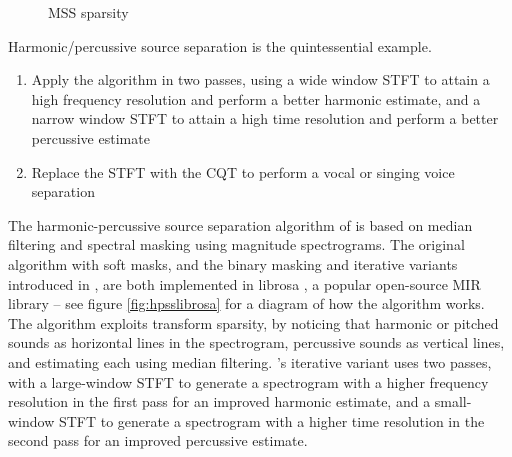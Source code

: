 \documentclass[report.tex]{subfiles}
\begin{document}
\begin{figure}[ht]
	\centering
	\caption{MSS sparsity}
	\label{fig:sepgood}
\end{figure}

Harmonic/percussive source separation is the quintessential example.

\begin{enumerate}
	\item
		Apply the algorithm in two passes, using a wide window STFT to attain a high frequency resolution and perform a better harmonic estimate, and a narrow window STFT to attain a high time resolution and perform a better percussive estimate \cite{fitzgerald2, driedger}
	\item
		Replace the STFT with the CQT to perform a vocal or singing voice separation \cite{fitzgerald2}
\end{enumerate}

The harmonic-percussive source separation algorithm of \textcite{fitzgerald1} is based on median filtering and spectral masking using magnitude spectrograms. The original algorithm with soft masks, and the binary masking and iterative variants introduced in \cite{driedger}, are both implemented in librosa \cite{librosa}, a popular open-source MIR library -- see figure \ref{fig:hpsslibrosa} for a diagram of how the algorithm works. The algorithm exploits transform sparsity, by noticing that harmonic or pitched sounds as horizontal lines in the spectrogram, percussive sounds as vertical lines, and estimating each using median filtering. \textcite{driedger}'s iterative variant uses two passes, with a large-window STFT to generate a spectrogram with a higher frequency resolution in the first pass for an improved harmonic estimate, and a small-window STFT to generate a spectrogram with a higher time resolution in the second pass for an improved percussive estimate.
\end{document}
